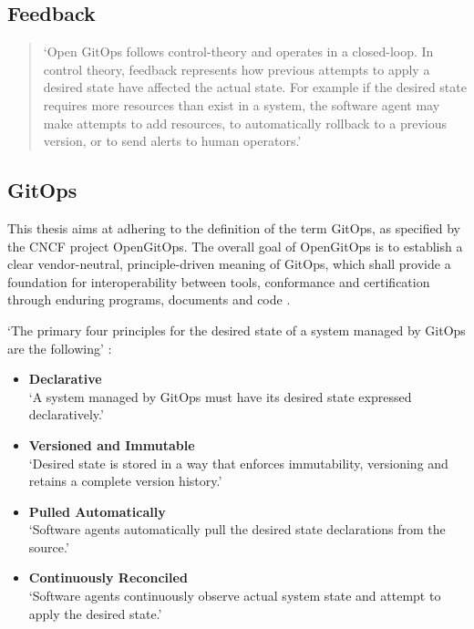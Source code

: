 \subsection*{Feedback}
\begin{quotation}
	\noindent
	\enquote*{Open GitOps follows control-theory and operates in a closed-loop. In control theory, feedback represents how previous attempts to apply a desired state have affected the actual state. For example if the desired state requires more resources than exist in a system, the software agent may make attempts to add resources, to automatically rollback to a previous version, or to send alerts to human operators.}
	\autocite{gitopsGlossary}
\end{quotation}

\subsection*{GitOps}

This thesis aims at adhering to the definition of the term GitOps,
as specified by the CNCF project OpenGitOps.
The overall goal of OpenGitOps is to establish a clear vendor-neutral,
principle-driven meaning of GitOps,
which shall provide a foundation for interoperability between tools, conformance and certification through enduring programs, documents and code
\autocite{opengitopsDocuments}.

\noindent
\enquote*{The primary four principles
	for the desired state of a
	system managed by GitOps are the following} \autocite{gitopsPrinciplesv100}:

\begin{itemize}
	\item \textbf{Declarative} \\
	\enquote*{A system managed by GitOps must have its desired state expressed declaratively.}
	\item \textbf{Versioned and Immutable} \\
	\enquote*{Desired state is stored in a way that enforces immutability, versioning and retains a complete version history.}
	\item \textbf{Pulled Automatically} \\
	\enquote*{Software agents automatically pull the desired state declarations from the source.}
	\item \textbf{Continuously Reconciled} \\
	\enquote*{Software agents continuously observe actual system state and attempt to apply the desired state.}
	\autocite{gitopsPrinciplesv100}
\end{itemize}

